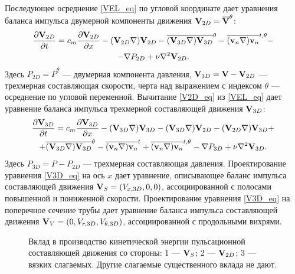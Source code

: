Последующее осреднение \eqref{VEL_eq} по угловой координате дает уравнения баланса импульса двумерной компоненты движения $\mathbf{V}_{2D} = \overline{\mathbf{V}}^\theta$:
\begin{multline} \label{V2D_eq}
\frac{\partial \mathbf{V}_{2D}}{\partial t} = c_m \frac{\partial \mathbf{V}_{2D}}{\partial x} - (\mathbf{V}_{2D} \nabla) \mathbf{V}_{2D} - \overline{(\mathbf{V}_{3D} \nabla) \mathbf{V}_{3D}}^{\theta} - \overline{(\mathbf{v}_n \nabla) \mathbf{v}_n}^{t,\theta} - \\ - \nabla P_{2D} + \nu \nabla^2 \mathbf{V}_{2D}.
\end{multline}
Здесь $P_{2D} = \overline{P}^{\theta}$ --- двумерная компонента давления, $\mathbf{V}_{3D} = \mathbf{V} - \mathbf{V}_{2D}$ --- трехмерная составляющая скорости, черта над выражением с индексом $\theta$ --- осреднение по угловой переменной. Вычитание \eqref{V2D_eq} из \eqref{VEL_eq} дает уравнение баланса импульса трехмерной составляющей движения $\mathbf{V}_{3D}$:
\begin{multline} \label{V3D_eq}
\frac{\partial \mathbf{V}_{3D}}{\partial t} = c_m \frac{\partial \mathbf{V}_{3D}}{\partial x} - (\mathbf{V}_{3D} \nabla) \mathbf{V}_{3D} - (\mathbf{V}_{3D} \nabla) \mathbf{V}_{2D} - (\mathbf{V}_{2D} \nabla) \mathbf{V}_{3D} + \\ + \overline{(\mathbf{V}_{3D} \nabla) \mathbf{V}_{3D}}^{\theta} - \overline{(\mathbf{v}_n \nabla) \mathbf{v}_n}^{t} + \overline{(\mathbf{v}_n \nabla) \mathbf{v}_n}^{t, \theta} - \nabla P_{3D} + \nu \nabla^2 \mathbf{V}_{3D}.
\end{multline}
Здесь $P_{3D} = P - P_{2D}$ --- трехмерная составляющая давления. Проектирование уравнения \eqref{V3D_eq} на ось $x$ дает уравнение, описывающее баланс импульса составляющей движения $\mathbf{V}_S = (V_{x,3D}, 0, 0)$, ассоциированной с полосами повышенной и пониженной скорости. Проектирование уравнения \eqref{V3D_eq} на поперечное сечение трубы дает уравнение баланса импульса составляющей движения $\mathbf{V}_V = (0, V_{r,3D}, V_{\theta,3D})$, ассоциированной с продольными вихрями. 

\begin{figure}
\caption{Вклад в производство кинетической энергии пульсационной составляющей движения со стороны: 1 --- $\mathbf{V}_S$; 2 --- $\mathbf{V}_{2D}$; 3 --- вязких слагаемых. Другие слагаемые существенного вклада не дают.}
\label{e1_parts_pic}
\end{figure}


